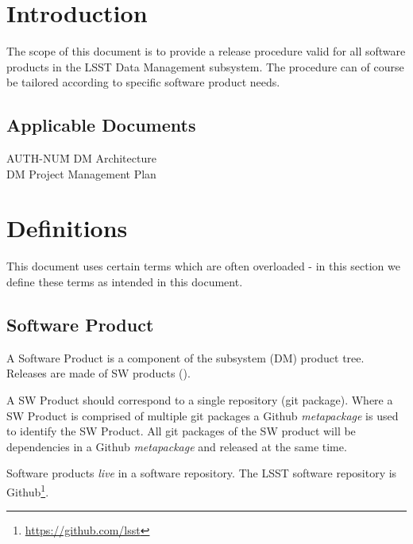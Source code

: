 \section{Introduction} \label{sec:intro}

The scope of this document is to provide a release procedure valid for all software products in the LSST Data Management subsystem. The procedure  can of course be tailored according to specific software product needs.

\subsection{Applicable Documents}

\begin{tabbing}
AUTH-NUM\= \kill
{} \>     DM Architecture\\
 \>     DM Project Management Plan   \\
\end{tabbing}


\newpage
\section{Definitions} \label{sec:definitions}

This document uses certain terms which are often overloaded -  in this section we define these terms  as intended in this document.


\subsection{Software Product} \label{sec:swprod}

A Software Product is a component of the subsystem (DM) product tree.
Releases are made of  SW products ().

A SW Product should correspond to a single repository (git package).
Where a SW Product is comprised of multiple git packages
a Github \textit{metapackage} is used to identify the SW Product.
All git packages of the SW product will be dependencies in a Github \textit{metapackage} and released at the same time.

Software products \textit{live} in a software repository. The LSST software repository is Github\footnote{\url{https://github.com/lsst}}.

